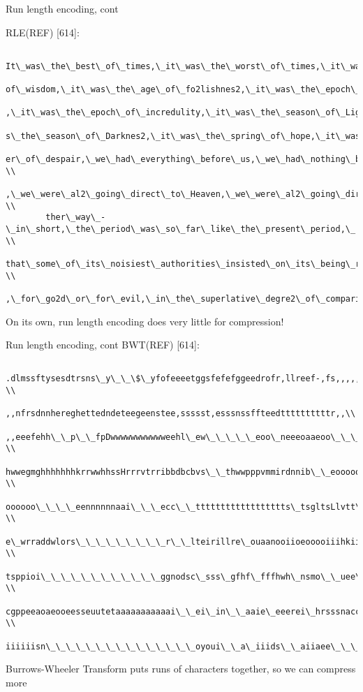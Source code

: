 \documentclass{beamer}
\begin{document}
\begin{frame}{Run length encoding, cont}
    \begin{center}
        \tiny RLE(REF) [614]:
        \begin{verbatim}
        It\_was\_the\_best\_of\_times,\_it\_was\_the\_worst\_of\_times,\_it\_was\_the\_age\_\\
        of\_wisdom,\_it\_was\_the\_age\_of\_fo2lishnes2,\_it\_was\_the\_epoch\_of\_belief\\
        ,\_it\_was\_the\_epoch\_of\_incredulity,\_it\_was\_the\_season\_of\_Light,\_it\_wa\\
        s\_the\_season\_of\_Darknes2,\_it\_was\_the\_spring\_of\_hope,\_it\_was\_the\_wint\\
        er\_of\_despair,\_we\_had\_everything\_before\_us,\_we\_had\_nothing\_before\_us \\
        ,\_we\_were\_al2\_going\_direct\_to\_Heaven,\_we\_were\_al2\_going\_direct\_the\_o \\
        ther\_way\_-\_in\_short,\_the\_period\_was\_so\_far\_like\_the\_present\_period,\_ \\
        that\_some\_of\_its\_noisiest\_authorities\_insisted\_on\_its\_being\_received \\
        ,\_for\_go2d\_or\_for\_evil,\_in\_the\_superlative\_degre2\_of\_comparison\_only.\$
        \end{verbatim}
    \end{center}
    \bigskip
    On its own, run length encoding does very little for compression!
\end{frame}

\begin{frame}{Run length encoding, cont}
    \tiny
    BWT(REF) [614]:
    \begin{verbatim}
        .dlmssftysesdtrsns\_y\_\_\$\_yfofeeeetggsfefefggeedrofr,llreef-,fs,,,,,,, \\
        ,,nfrsdnnhereghettedndeteegeenstee,ssssst,esssnssffteedttttttttttr,,\\
        ,,eeefehh\_\_p\_\_fpDwwwwwwwwwwweehl\_ew\_\_\_\_\_eoo\_neeeoaaeoo\_\_\_\_sephhrrhvh \\
        hwwegmghhhhhhhkrrwwhhssHrrrvtrribbdbcbvs\_\_thwwpppvmmirdnnib\_\_eoooooo \\
        oooooo\_\_\_\_eennnnnnaai\_\_\_ecc\_\_tttttttttttttttttts\_tsgltsLlvtt\_\_\_hhoor \\
        e\_wrraddwlors\_\_\_\_\_\_\_\_\_r\_\_lteirillre\_ouaanooiioeooooiiihkiiiiiio\_\_iei \\
        tsppioi\_\_\_\_\_\_\_\_\_\_\_\_ggnodsc\_sss\_gfhf\_fffhwh\_nsmo\_\_uee\_sioooaeeeeoo\_ii \\
        cgppeeaoaeooeesseuutetaaaaaaaaaaai\_\_ei\_in\_\_aaie\_eeerei\_hrsssnacciiIi \\
        iiiiiisn\_\_\_\_\_\_\_\_\_\_\_\_\_\_\_oyoui\_\_a\_iiids\_\_aiiaee\_\_\_\_\_\_\_\_\_\_\_\_\_\_\_\_\_\_\_\_\_tlar
    \end{verbatim}
    \bigskip \normalsize
    Burrows-Wheeler Transform puts runs of characters together, so we can compress more
\end{frame}
\end{document}
